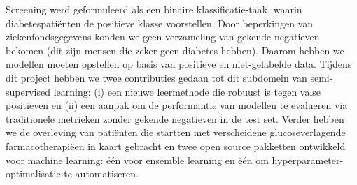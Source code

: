
Screening werd geformuleerd als een binaire klassificatie-taak, waarin diabetespati\"enten de positieve klasse voorstellen. Door beperkingen van ziekenfondsgegevens konden we geen verzameling van gekende negatieven bekomen (dit zijn mensen die zeker geen diabetes hebben). Daarom hebben we modellen moeten opstellen op basis van positieve en niet-gelabelde data. Tijdens dit project hebben we twee contributies gedaan tot dit subdomein van semi-supervised learning: (i) een nieuwe leermethode die robuust is tegen valse positieven en (ii) een aanpak om de performantie van modellen te evalueren via traditionele metrieken zonder gekende negatieven in de test set. Verder hebben we de overleving van pati\"enten die startten met verscheidene glucoseverlagende farmacotherapi\"een in kaart gebracht en twee open source pakketten ontwikkeld voor machine learning: \'e\'en voor ensemble learning en \'e\'en om hyperparameter-optimalisatie te automatiseren.


